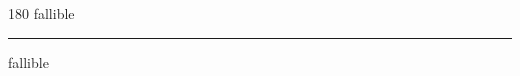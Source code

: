 
\begin{frame}
\begin{center}
\begin{turn}{180}
{\fontsize{2.5cm}{1em}\selectfont fallible}
\end{turn}
\vspace{1em}\par  
\hrule
\vspace{1em}\par  
{\fontsize{2.5cm}{1em}\selectfont fallible}
\end{center}
\end{frame}
